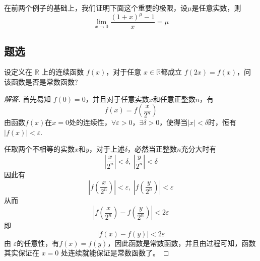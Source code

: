 \begin{example}
  \label{example:1-plus-x-power-subtract-1-equalitant-to-x}
  在前两个例子的基础上，我们证明下面这个重要的极限，设$\mu$是任意实数，则
  \[ \lim_{x \to 0} \frac{(1+x)^{\mu}-1}{x} = \mu \]
\end{example}

\subsection{题选}
\label{sec:exercise-for-continuousness-of-function}

\begin{exercise}
  设定义在 $\mathbb{R}$ 上的连续函数 $f(x)$，对于任意 $x \in \mathbb{R}$都成立 $f(2x)=f(x)$，问该函数是否是常数函数?
\end{exercise}

\begin{proof}[解答]
  首先易知 $f(0)=0$，并且对于任意实数$x$和任意正整数$n$，有
  \[ f(x) = f \left( \frac{x}{2^n} \right) \]
  由函数$f(x)$在$x=0$处的连续性，$\forall \varepsilon>0$，$\exists \delta>0$，使得当$|x|<\delta$时，恒有$|f(x)|<\varepsilon$.

  任取两个不相等的实数$x$和$y$，对于上述$\delta$，必然当正整数$n$充分大时有
  \[ \left| \frac{x}{2^n} \right| < \delta, \  \left| \frac{y}{2^n} \right| < \delta \]
  因此有
  \[ \left| f \left( \frac{x}{2^n} \right) \right| < \varepsilon, \  \left| f \left( \frac{y}{2^n} \right) \right| < \varepsilon \]
  从而
  \[ \left| f \left( \frac{x}{2^n} \right) - f \left( \frac{y}{2^n} \right) \right| < 2\varepsilon \]
  即
  \[ |f(x)-f(y)| < 2\varepsilon \]
  由 $\varepsilon$的任意性，有$f(x)=f(y)$，因此函数是常数函数，并且由过程可知，函数其实保证在 $x=0$ 处连续就能保证是常数函数了。
\end{proof}



